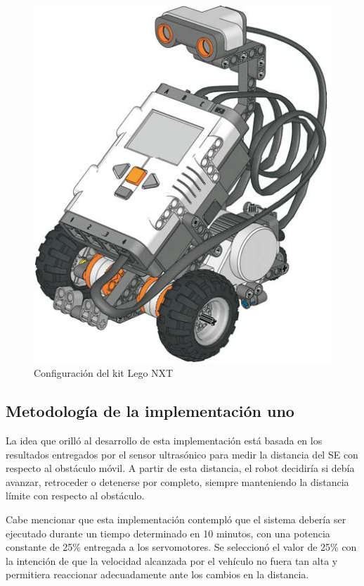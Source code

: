 \documentclass[journal]{IEEEtran}
\begin{document}
\begin{figure}[!t]
\centering
\includegraphics[width=\columnwidth]{diagramas/configuracion-lego}
\caption{Configuración del kit Lego NXT}
\label{fig:configuracion-lego}
\end{figure}

\subsection{Metodología de la implementación uno}
\label{sub:metodologia-implementacion-uno}

La idea que orilló al desarrollo de esta implementación está basada en los resultados entregados por el sensor ultrasónico para medir la distancia del SE con respecto al obstáculo móvil.
A partir de esta distancia, el robot decidiría si debía avanzar, retroceder o detenerse por completo, siempre manteniendo la distancia límite con respecto al obstáculo.

Cabe mencionar que esta implementación contempló que el sistema debería ser ejecutado durante un tiempo determinado en 10 minutos, con una potencia constante de 25\% entregada a los servomotores.
Se seleccionó el valor de 25\% con la intención de que la velocidad alcanzada por el vehículo no fuera tan alta y permitiera reaccionar adecuadamente ante los cambios en la distancia.
\end{document}
